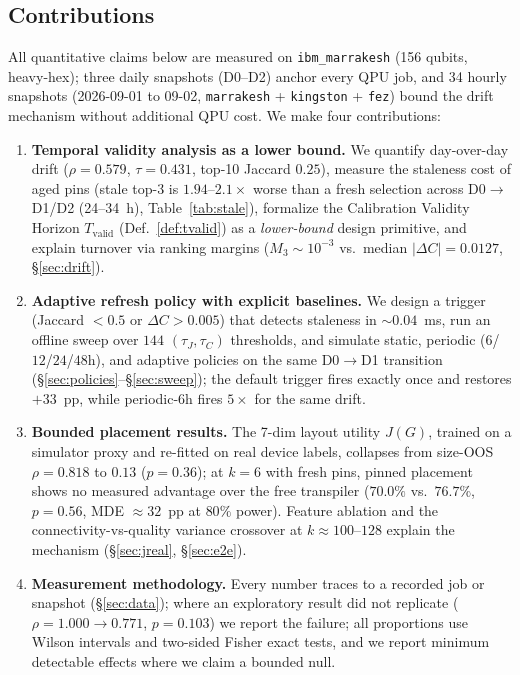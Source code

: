 \documentclass[journal,10pt,twocolumn]{IEEEtran}
\begin{document}
\subsection{Contributions}
All quantitative claims below are measured on \texttt{ibm\_marrakesh} (156 qubits, heavy-hex);
three daily snapshots (D0--D2) anchor every QPU job, and 34 hourly snapshots (2026-09-01 to 09-02,
\texttt{marrakesh} + \texttt{kingston} + \texttt{fez}) bound the drift mechanism without additional
QPU cost. We make four contributions:
\begin{enumerate}[leftmargin=1.8em,itemsep=1pt,topsep=2pt]
\item \textbf{Temporal validity analysis as a lower bound.} We quantify day-over-day drift
($\rho{=}0.579$, $\tau{=}0.431$, top-10 Jaccard $0.25$), measure the staleness cost of aged pins
(stale top-3 is $1.94$--$2.1\times$ worse than a fresh selection across D0$\to$D1/D2 (24--34~h),
Table~\ref{tab:stale}), formalize
the Calibration Validity Horizon $T_{\mathrm{valid}}$ (Def.~\ref{def:tvalid}) as a
\emph{lower-bound} design primitive, and explain turnover via ranking margins
($M_3\sim10^{-3}$ vs.\ median $|\Delta C|=0.0127$, \S\ref{sec:drift}).
\item \textbf{Adaptive refresh policy with explicit baselines.} We design a trigger
(Jaccard $<0.5$ or $\Delta C{>}0.005$) that detects staleness in $\sim0.04$~ms, run an offline sweep over
$144$ $(\tau_J,\tau_C)$ thresholds, and simulate static, periodic ($6$/$12$/$24$/$48$h), and adaptive
policies on the same D0$\to$D1 transition (\S\ref{sec:policies}--\S\ref{sec:sweep}); the default trigger
fires exactly once and restores $+33$~pp, while periodic-$6$h fires $5\times$ for the same drift.
\item \textbf{Bounded placement results.} The 7-dim layout utility $J(G)$, trained on a simulator proxy and
re-fitted on real device labels, collapses from size-OOS $\rho{=}0.818$ to $0.13$
($p{=}0.36$); at $k{=}6$ with fresh pins, pinned placement shows no measured advantage over the
free transpiler ($70.0\%$ vs.\ $76.7\%$, $p{=}0.56$, MDE $\approx32$~pp at $80\%$ power). Feature ablation
and the connectivity-vs-quality variance crossover at $k\approx100$--$128$ explain the mechanism
(\S\ref{sec:jreal}, \S\ref{sec:e2e}).
\item \textbf{Measurement methodology.} Every number traces to a recorded job or snapshot
(\S\ref{sec:data}); where an exploratory result did not replicate ($\rho{=}1.000\to0.771$, $p{=}0.103$)
we report the failure; all proportions use Wilson intervals and two-sided Fisher exact tests, and we
report minimum detectable effects where we claim a bounded null.
\end{enumerate}
\end{document}
